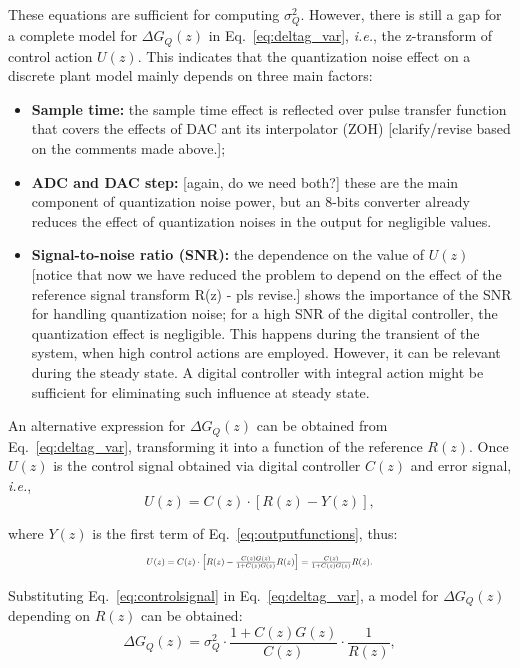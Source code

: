 \documentclass{sig-alternate-05-2015}
\newcommand{\red}[1]{{\color{red}#1}}
\begin{document}
These equations are sufficient for computing $\sigma_{Q}^{2}$.  However,
there is still a gap for a complete model for $\Delta{G_{Q}(z)}$ in
Eq.~\eqref{eq:deltag_var}, {\it i.e.}, the z-transform of control action
$U(z)$.  This indicates that the quantization noise effect on a discrete
plant model mainly depends on three main factors:
%
\begin{itemize}
%
\item \textbf{Sample time:} the sample time effect is reflected over pulse transfer function that covers the effects of DAC ant its interpolator (ZOH) \red{[clarify/revise based on the comments made above.]};
%
\item \textbf{ADC and DAC step:} \red{[again, do we need both?]} these are the main component of quantization noise power, but an $8$-bits converter already reduces the effect of quantization noises in the output for negligible values.
%
\item \textbf{Signal-to-noise ratio (SNR): } the dependence on the value of $U(z)$ \red{[notice that now we have reduced the problem to depend on the effect of the reference signal transform R(z) - pls revise.]} shows the importance of the SNR for handling quantization noise; for a high SNR of the digital controller, the quantization effect is negligible. This happens during the transient of the system, when high control actions are employed. However, it can be relevant during the steady state. A digital controller with integral action might be sufficient for eliminating such influence at steady state.
%
\end{itemize}

An alternative expression for $\Delta{G_{Q}(z)}$ can be obtained from
Eq.~\eqref{eq:deltag_var}, transforming it into a function of the reference
$R(z)$.  Once $U(z)$ is the control signal obtained via digital controller
$C(z)$ and error signal, {\it i.e.},
%
\begin{equation}
U(z)=C(z)\cdot[R(z)-Y(z)],
\end{equation} 

\noindent where $Y(z)$ is the first term of Eq.~\eqref{eq:outputfunctions}, thus:
\begin{equation}
\label{eq:controlsignal}
\resizebox{0.48\textwidth}{!}{
$U(z)=C(z)\cdot \left[R(z)-\frac{C(z)G(z)}{1+C(z)G(z)}R(z)\right]=\frac{C(z)}{1+C(z)G(z)}R(z).$
}
\end{equation} 

Substituting Eq.~\eqref{eq:controlsignal} in Eq.~\eqref{eq:deltag_var}, a
model for $\Delta{G_{Q}(z)}$ depending on $R(z)$ can be obtained:
%
\begin{equation}
\Delta{G_{Q}(z)}=\sigma^{2}_{Q}\cdot \frac{1+C(z)G(z)}{C(z)} \cdot \frac{1}{R(z)},
\end{equation}
\end{document}

